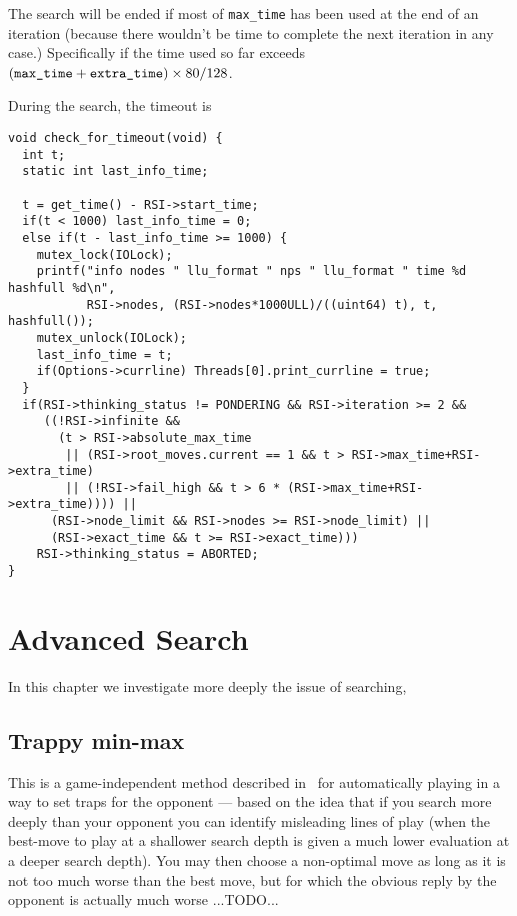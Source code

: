 \documentclass[10pt,dvipdfmx,letterpaper]{report}
\let\x=\times
\begin{document}
The search will be ended if most of \verb|max_time| has been used at the end
of an iteration (because there wouldn't be time to complete the next iteration
in any case.)  Specifically if the time used so far exceeds
$(\verb|max_time| + \verb|extra_time|)\x80/128$.

During the search, the timeout is
{\scriptsize
\begin{verbatim}
void check_for_timeout(void) {
  int t;
  static int last_info_time;

  t = get_time() - RSI->start_time;
  if(t < 1000) last_info_time = 0;
  else if(t - last_info_time >= 1000) {
    mutex_lock(IOLock);
    printf("info nodes " llu_format " nps " llu_format " time %d hashfull %d\n",
           RSI->nodes, (RSI->nodes*1000ULL)/((uint64) t), t, hashfull());
    mutex_unlock(IOLock);
    last_info_time = t;
    if(Options->currline) Threads[0].print_currline = true;
  }
  if(RSI->thinking_status != PONDERING && RSI->iteration >= 2 &&
     ((!RSI->infinite && 
       (t > RSI->absolute_max_time
        || (RSI->root_moves.current == 1 && t > RSI->max_time+RSI->extra_time) 
        || (!RSI->fail_high && t > 6 * (RSI->max_time+RSI->extra_time)))) ||
      (RSI->node_limit && RSI->nodes >= RSI->node_limit) ||
      (RSI->exact_time && t >= RSI->exact_time)))
    RSI->thinking_status = ABORTED;
}
\end{verbatim}
}


\chapter{Advanced Search}
\label{chap-advanced-search}

In this chapter we investigate more deeply the issue of searching,

\section{Trappy min-max}

This is a game-independent method described in~\cite{gordonreda}
for automatically playing in a way to set traps for the opponent
--- based on the idea that if you search more deeply than your opponent you can
identify misleading lines of play (when the best-move to play at a shallower
search depth is given a much lower evaluation at a deeper search depth).
You may then choose a non-optimal move as long as it is not too much worse than the
best move, but for which the obvious reply by the opponent is actually much worse ...TODO...
\end{document}
